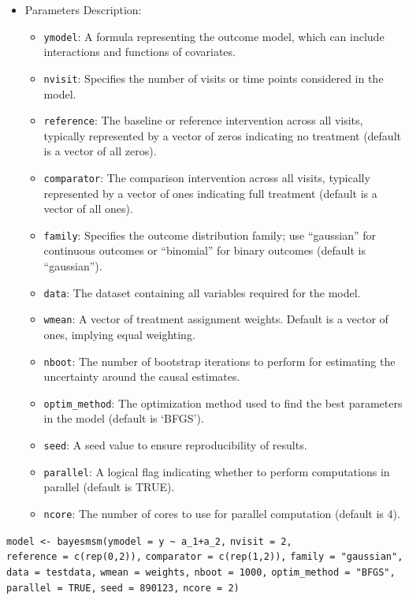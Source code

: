 \begin{itemize}
\tightlist
\item
  Parameters Description:

  \begin{itemize}
  \tightlist
  \item
    \texttt{ymodel}: A formula representing the outcome model, which can
    include interactions and functions of covariates.
  \item
    \texttt{nvisit}: Specifies the number of visits or time points
    considered in the model.
  \item
    \texttt{reference}: The baseline or reference intervention across all
    visits, typically represented by a vector of zeros indicating no
    treatment (default is a vector of all zeros).
  \item
    \texttt{comparator}: The comparison intervention across all visits,
    typically represented by a vector of ones indicating full
    treatment (default is a vector of all ones).
  \item
    \texttt{family}: Specifies the outcome distribution family; use
    ``gaussian'' for continuous outcomes or ``binomial'' for binary
    outcomes (default is ``gaussian'').
  \item
    \texttt{data}: The dataset containing all variables required for the
    model.
  \item
    \texttt{wmean}: A vector of treatment assignment weights. Default is a
    vector of ones, implying equal weighting.
  \item
    \texttt{nboot}: The number of bootstrap iterations to perform for
    estimating the uncertainty around the causal estimates.
  \item
    \texttt{optim\_method}: The optimization method used to find the best
    parameters in the model (default is `BFGS').
  \item
    \texttt{seed}: A seed value to ensure reproducibility of results.
  \item
    \texttt{parallel}: A logical flag indicating whether to perform
    computations in parallel (default is TRUE).
  \item
    \texttt{ncore}: The number of cores to use for parallel computation
    (default is 4).
  \end{itemize}
\end{itemize}

\texttt{model\ \textless{}-\ bayesmsm(ymodel\ =\ y\ \textasciitilde{}\ a\_1+a\_2,}
\texttt{nvisit\ =\ 2,}
\texttt{reference\ =\ c(rep(0,2)),}
\texttt{comparator\ =\ c(rep(1,2)),}
\texttt{family\ =\ "gaussian",}
\texttt{data\ =\ testdata,}
\texttt{wmean\ =\ weights,}
\texttt{nboot\ =\ 1000,}
\texttt{optim\_method\ =\ "BFGS",}
\texttt{parallel\ =\ TRUE,}
\texttt{seed\ =\ 890123,}
\texttt{ncore\ =\ 2)}

